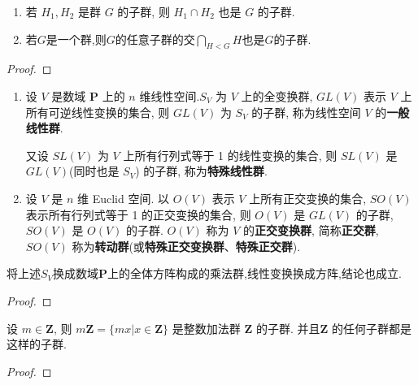 \documentclass[../../main.tex]{subfiles}
\begin{document}
\begin{corollary}
\begin{enumerate}
\item 若 \( H_1, H_2 \) 是群 \( G \) 的子群, 则 \( H_1 \cap H_2 \) 也是 \( G \) 的子群.

\item 若$G$是一个群,则$G$的任意子群的交$\bigcap_{H<G}{H}$也是$G$的子群.
\end{enumerate}
\end{corollary}
\begin{proof}


\end{proof}

\begin{example}
\begin{enumerate}
\item 设 \( V \) 是数域 \( \mathbf{P} \) 上的 \( n \) 维线性空间.\( S_V \) 为 \( V \) 上的全变换群, \( GL(V) \) 表示 \( V \) 上所有可逆线性变换的集合, 则 \( GL(V) \) 为 \( S_V \) 的子群, 称为线性空间 \( V \) 的\textbf{一般线性群}. 

又设 \( SL(V) \) 为 \( V \) 上所有行列式等于 1 的线性变换的集合, 则 \( SL(V) \) 是 \( GL(V) \)(同时也是 \( S_V \)) 的子群, 称为\textbf{特殊线性群}.

\item 设 \( V \) 是 \( n \) 维 Euclid 空间. 以 \( O(V) \) 表示 \( V \) 上所有正交变换的集合, \( SO(V) \) 表示所有行列式等于 1 的正交变换的集合, 则 \( O(V) \) 是 \( GL(V) \) 的子群, \( SO(V) \) 是 \( O(V) \) 的子群. \( O(V) \) 称为 \( V \) 的\textbf{正交变换群}, 简称\textbf{正交群}, \( SO(V) \) 称为\textbf{转动群}(或\textbf{特殊正交变换群}、\textbf{特殊正交群}).
\end{enumerate}
\end{example}
\begin{remark}
将上述$S_V$换成数域$\mathbf{P}$上的全体方阵构成的乘法群,线性变换换成方阵,结论也成立.
\end{remark}
\begin{proof}


\end{proof}

\begin{example}
设 \( m \in \mathbf{Z} \), 则 \( m\mathbf{Z} = \{mx|x \in \mathbf{Z}\} \) 是整数加法群 \( \mathbf{Z} \) 的子群. 并且\( \mathbf{Z} \) 的任何子群都是这样的子群.
\end{example}
\begin{proof}


\end{proof}
\end{document}
